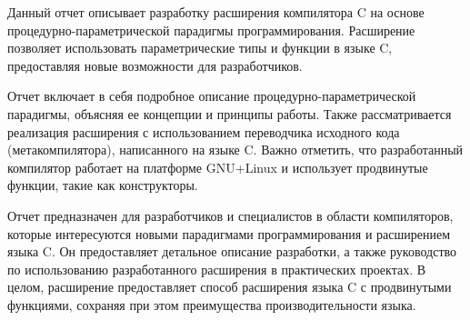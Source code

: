 
Данный отчет описывает разработку расширения компилятора C на основе процедурно-параметрической парадигмы программирования. Расширение позволяет использовать параметрические типы и функции в языке C, предоставляя новые возможности для разработчиков.

Отчет включает в себя подробное описание процедурно-параметрической парадигмы, объясняя ее концепции и принципы работы. Также рассматривается реализация расширения с использованием переводчика исходного кода (метакомпилятора), написанного на языке C.
Важно отметить, что разработанный компилятор работает на платформе GNU+Linux и использует продвинутые функции, такие как конструкторы.

Отчет предназначен для разработчиков и специалистов в области компиляторов, которые интересуются новыми парадигмами программирования и расширением языка C. Он предоставляет детальное описание разработки, а также руководство по использованию разработанного расширения в практических проектах.
В целом, расширение предоставляет способ расширения языка C с продвинутыми функциями, сохраняя при этом преимущества производительности языка.
